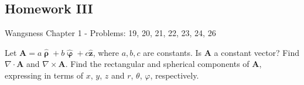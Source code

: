 \documentclass[crop=false,class=article,oneside]{standalone}
\begin{document}
    \subsection{Homework III}
        Wangsness Chapter 1 - Problems: 19, 20, 21, 22, 23, 24, 26
        \begin{problem}[Wangsness 1-19]
            Let
            $\mathbf{A}%
             =a\hat{\boldsymbol{\uprho}}%
             +b\hat{\boldsymbol{\upvarphi}}%
             +c\hat{\mathbf{z}}$,
            where $a,b,c$ are constants. Is $\mathbf{A}$ a
            constant vector? Find $\nabla\cdot\mathbf{A}$ and
            $\nabla\times\mathbf{A}$. Find the rectangular
            and spherical components of $\mathbf{A}$, expressing
            in terms of $x$, $y$, $z$ and
            $r$, $\theta$, $\varphi$, respectively.
        \end{problem}
\end{document}
